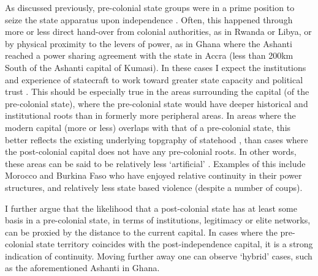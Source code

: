 \documentclass[12pt]{article}
\begin{document}
As discussed previously, pre-colonial state groups were in a prime position to
seize the state apparatus upon independence \citep{Paine2019,
Wucherpfennig2016}. Often, this happened through more or less direct hand-over
from colonial authorities, as in Rwanda or Libya, or by physical proximity to
the levers of power, as in Ghana where the Ashanti reached a power sharing
agreement with the state in Accra (less than 200km South of the Ashanti capital
of Kumasi). In these cases I expect the institutions and experience of
statecraft to work toward greater state capacity and political trust
\citep{Depetris-Chauvin2016}. This should be especially true in the areas
surrounding the capital (of the pre-colonial state), where the pre-colonial
state would have deeper historical and institutional roots than in formerly more
peripheral areas. In areas where the modern capital (more or less) overlaps with
that of a pre-colonial state, this better reflects the existing underlying
topgraphy of statehood , than cases where the post-colonial capital does not
have any pre-colonial roots. In other words, these areas can be said to be
relatively less `artificial' \citep{Alesina2011}. Examples of this include
Morocco and Burkina Faso who have enjoyed relative continuity in their power
structures, and relatively less state based violence (despite a number of
coups). 

I further argue that the likelihood that a post-colonial state has at least some
basis in a pre-colonial state, in terms of institutions, legitimacy or elite
networks, can be proxied by the distance to the current capital. In cases where
the pre-colonial state territory coincides with the post-independence capital, it
is a strong indication of continuity. Moving further away one can observe
`hybrid' cases, such as the aforementioned Ashanti in Ghana. 


\end{document}
